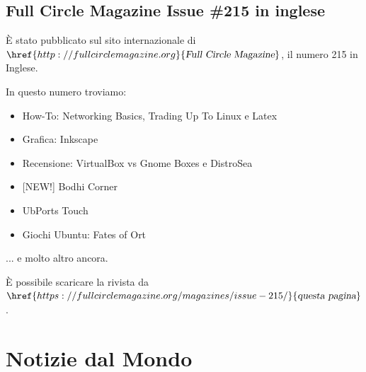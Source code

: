 \documentclass[a4paper,twoside]{article}
\begin{document}
\subsection{Full Circle Magazine Issue \#215 in inglese}
È stato pubblicato sul sito internazionale di $\href{http://fullcirclemagazine.org}{\textsl{Full Circle Magazine}}$, il numero 215 in Inglese.

In questo numero troviamo:

\begin{itemize}
\item How-To: Networking Basics, Trading Up To Linux e Latex
\item Grafica: Inkscape
\item Recensione: VirtualBox vs Gnome Boxes e DistroSea
\item {[NEW!]} Bodhi Corner
\item UbPorts Touch
\item Giochi Ubuntu: Fates of Ort
\end{itemize}

... e molto altro ancora.

È possibile scaricare la rivista da $\href{https://fullcirclemagazine.org/magazines/issue-215/}{\textsl{questa pagina}}$.

\section{Notizie dal Mondo}
\end{document}
